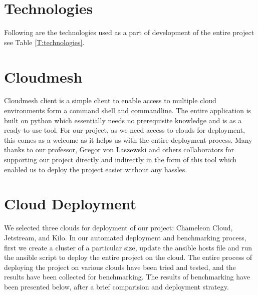 \documentclass[9pt,twocolumn,twoside]{../../styles/osajnl}
\begin{document}
\section{Technologies}
Following are the technologies used as a part of development of the entire 
project see Table \ref{T:technologies}.
\begin{table}[htb]
\caption{Technologies} 
\label{T:technologies}
\centering
{}
\end{table}

\section{Cloudmesh}
Cloudmesh client is a simple client to enable access to multiple cloud
environments form a command shell and commandline. The entire
application is built on python which essentially needs no prerequisite
knowledge and is as a ready-to-use tool. For our project, as we need
access to clouds for deployment, this comes as a welcome as it helps
us with the entire deployment process. Many thanks to our professor,
Gregor von Laszewski and others collaborators for supporting our
project directly and indirectly in the form of this tool which enabled
us to deploy the project easier without any hassles.

\section{Cloud Deployment}
We selected three clouds for deployment of our project: Chameleon
Cloud, Jetstream, and Kilo. In our automated deployment and
benchmarking process, first we create a cluster of a particular size,
update the ansible hosts file and run the ansible script to deploy the
entire project on the cloud. The entire process of deploying the
project on various clouds have been tried and tested, and the results
have been collected for benchmarking. The results of benchmarking have
been presented below, after a brief comparision and deployment
strategy.
\end{document}
